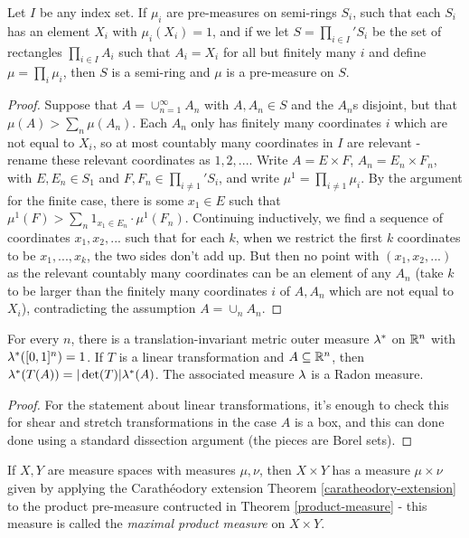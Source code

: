 \begin{thm} Let $I$ be any index set. If $\mu_i$ are pre-measures on semi-rings $S_i$, such that each $S_i$ has an element $X_i$ with $\mu_i(X_i) = 1$, and if we let $S = \prod_{i\in I}' S_i$ be the set of rectangles $\prod_{i \in I} A_i$ such that $A_i = X_i$ for all but finitely many $i$ and define $\mu = \prod_i \mu_i$, then $S$ is a semi-ring and $\mu$ is a pre-measure on $S$.
\end{thm}
\begin{proof} Suppose that $A = \cup_{n=1}^\infty A_n$ with $A, A_n \in S$ and the $A_n$s disjoint, but that $\mu(A) > \sum_n \mu(A_n)$. Each $A_n$ only has finitely many coordinates $i$ which are not equal to $X_i$, so at most countably many coordinates in $I$ are relevant - rename these relevant coordinates as $1, 2, ...$. Write $A = E \times F$, $A_n = E_n \times F_n$, with $E, E_n \in S_1$ and $F, F_n \in \prod_{i \ne 1}' S_i$, and write $\mu^1 = \prod_{i \ne 1} \mu_i$. By the argument for the finite case, there is some $x_1 \in E$ such that $\mu^1(F) > \sum_n 1_{x_1 \in E_n}\cdot \mu^1(F_n)$. Continuing inductively, we find a sequence of coordinates $x_1, x_2, ...$ such that for each $k$, when we restrict the first $k$ coordinates to be $x_1, ..., x_k$, the two sides don't add up. But then no point with $(x_1, x_2, ...)$ as the relevant countably many coordinates can be an element of any $A_n$ (take $k$ to be larger than the finitely many coordinates $i$ of $A, A_n$ which are not equal to $X_i$), contradicting the assumption $A = \cup_n A_n$.
\end{proof}

\begin{cor} For every $n$, there is a translation-invariant metric outer measure $\lambda^*$ on $\mathbb{R}^n$ with $\lambda^*([0,1]^n) = 1$. If $T$ is a linear transformation and $A \subseteq \mathbb{R}^n$, then $\lambda^*(T(A)) = |\det(T)|\lambda^*(A)$. The associated measure $\lambda$ is a Radon measure.
\end{cor}
\begin{proof} For the statement about linear transformations, it's enough to check this for shear and stretch transformations in the case $A$ is a box, and this can done done using a standard dissection argument (the pieces are Borel sets).
\end{proof}

\begin{defn} If $X,Y$ are measure spaces with measures $\mu, \nu$, then $X\times Y$ has a measure $\mu\times \nu$ given by applying the Carath\'eodory extension Theorem \ref{caratheodory-extension} to the product pre-measure contructed in Theorem \ref{product-measure} - this measure is called the \emph{maximal product measure} on $X\times Y$.
\end{defn}

